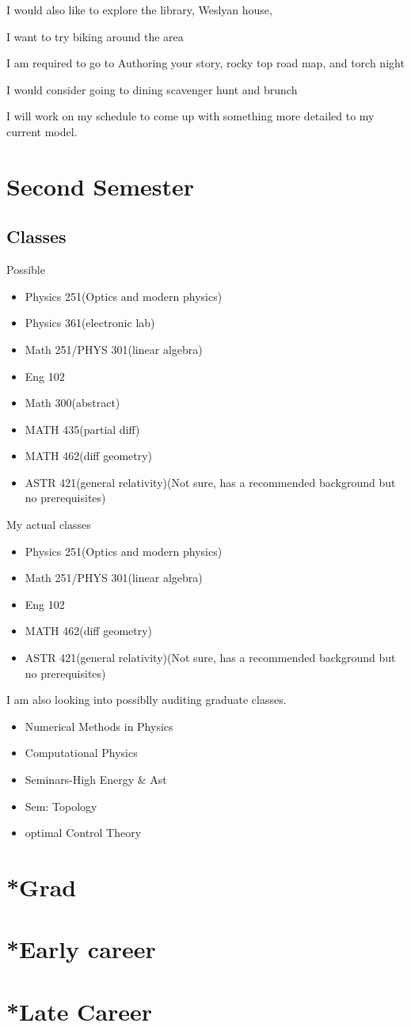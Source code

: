 I would also like to explore the library, Weslyan house,

I want to try biking around the area

I am required to go to Authoring your story, rocky top road map, and torch night

I would consider going to dining scavenger hunt and brunch

I will work on my schedule to come up with something more detailed to my current model.
\section{Second Semester}
\subsection{Classes}
Possible
\begin{itemize}
  \item Physics 251(Optics and modern physics)
  \item Physics 361(electronic lab)
  \item Math 251/PHYS 301(linear algebra)
  \item Eng 102
  \item Math 300(abstract)
  \item MATH 435(partial diff)
  \item MATH 462(diff geometry)
  \item ASTR 421(general relativity)(Not sure, has a recommended background but no prerequisites)
\end{itemize}

My actual classes
\begin{itemize}
  \item Physics 251(Optics and modern physics)
  \item Math 251/PHYS 301(linear algebra)
  \item Eng 102
  \item MATH 462(diff geometry)
  \item ASTR 421(general relativity)(Not sure, has a recommended background but no prerequisites)
\end{itemize}

I am also looking into possiblly auditing graduate classes.
\begin{itemize}
  \item Numerical Methods in Physics
  \item Computational Physics
  \item Seminars-High Energy \& Ast
  \item Sem: Topology
  \item optimal Control Theory
\end{itemize}


\section{*Grad}

\section{*Early career}

\section{*Late Career}
